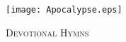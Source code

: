 \fancyhead[RE,LO]{}\fancyhead[RO,LE]{}
\fancyhead[C]{}\thispagestyle{empty}
{}
  \begin{center}
   \texttt{[image: Apocalypse.eps]}
   \par
   \vspace{2ex}
   	\textsc{\Huge{Devotional Hymns}}
   \end{center}